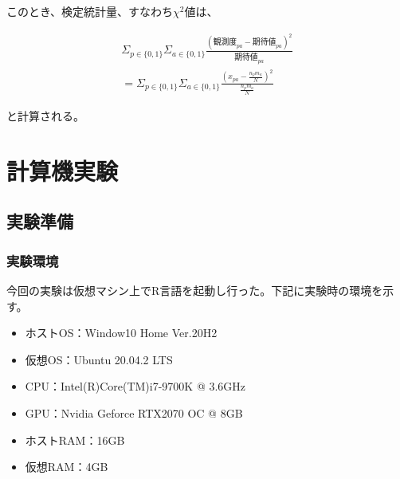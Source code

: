 \documentclass[dvipdfmx]{jsarticle}
\begin{document}
このとき、検定統計量、すなわち$χ^{2}値$は、
\begin{center}
  \begin{align*}
    \Sigma_{p \in \{0,1\}}\Sigma_{a \in \{0,1\}}\frac{(観測度_{pa}-期待値_{pa})^{2}}{期待値_{pa}}　\\
     = \Sigma_{p \in \{0,1\}}\Sigma_{a\in \{0,1\}}\frac{(x_{pa}-\frac{n_{p}m_{a}}{N})^{2}}{\frac{n_{p}m_{a}}{N}}
  \end{align*}
\end{center}
と計算される。
\section{計算機実験}
\subsection{実験準備}
  \subsubsection{実験環境}
  今回の実験は仮想マシン上でR言語を起動し行った。下記に実験時の環境を示す。
  \begin{itemize}
    \item ホストOS：Window10 Home Ver.20H2
    \item 仮想OS：Ubuntu 20.04.2 LTS
    \item CPU：Intel(R)Core(TM)i7-9700K @ 3.6GHz
    \item GPU：Nvidia Geforce RTX2070 OC @ 8GB
    \item ホストRAM：16GB
    \item 仮想RAM：4GB
  \end{itemize}
\end{document}
